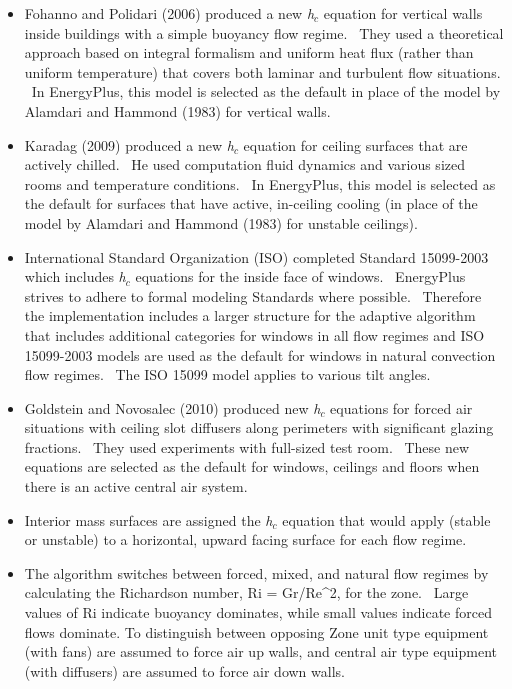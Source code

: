 \begin{itemize}
\item
  Fohanno and Polidari (2006) produced a new \emph{h\(_{c}\)} equation for vertical walls inside buildings with a simple buoyancy flow regime.~ They used a theoretical approach based on integral formalism and uniform heat flux (rather than uniform temperature) that covers both laminar and turbulent flow situations. ~In EnergyPlus, this model is selected as the default in place of the model by Alamdari and Hammond (1983) for vertical walls.
\item
  Karadag (2009) produced a new \emph{h\(_{c}\)} equation for ceiling surfaces that are actively chilled.~ He used computation fluid dynamics and various sized rooms and temperature conditions.~ In EnergyPlus, this model is selected as the default for surfaces that have active, in-ceiling cooling (in place of the model by Alamdari and Hammond (1983) for unstable ceilings).
\item
  International Standard Organization (ISO) completed Standard 15099-2003 which includes \emph{h\(_{c}\)} equations for the inside face of windows.~ EnergyPlus strives to adhere to formal modeling Standards where possible.~ Therefore the implementation includes a larger structure for the adaptive algorithm that includes additional categories for windows in all flow regimes and ISO 15099-2003 models are used as the default for windows in natural convection flow regimes.~ The ISO 15099 model applies to various tilt angles.
\item
  Goldstein and Novosalec (2010) produced new \emph{h\(_{c}\)} equations for forced air situations with ceiling slot diffusers along perimeters with significant glazing fractions.~ They used experiments with full-sized test room.~ These new equations are selected as the default for windows, ceilings and floors when there is an active central air system.
\item
  Interior mass surfaces are assigned the \emph{h\(_{c}\)} equation that would apply (stable or unstable) to a horizontal, upward facing surface for each flow regime.
\item
  The algorithm switches between forced, mixed, and natural flow regimes by calculating the Richardson number, Ri = Gr/Re\^{}2, for the zone.~ Large values of Ri indicate buoyancy dominates, while small values indicate forced flows dominate. To distinguish between opposing Zone unit type equipment (with fans) are assumed to force air up walls, and central air type equipment (with diffusers) are assumed to force air down walls.
\end{itemize}

